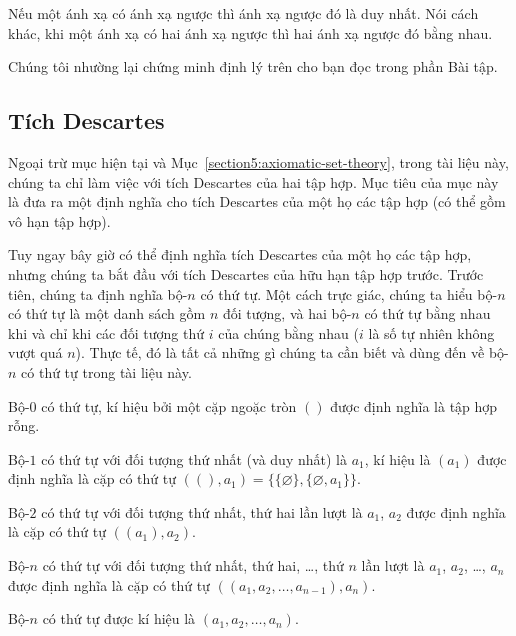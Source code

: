 \begin{theorem}
    Nếu một ánh xạ có ánh xạ ngược thì ánh xạ ngược đó là duy nhất. Nói cách khác, khi một ánh xạ có hai ánh xạ ngược thì hai ánh xạ ngược đó bằng nhau.
\end{theorem}

Chúng tôi nhường lại chứng minh định lý trên cho bạn đọc trong phần Bài tập.

\subsection{Tích Descartes}

Ngoại trừ mục hiện tại và Mục~\ref{section5:axiomatic-set-theory}, trong tài liệu này, chúng ta chỉ làm việc với tích Descartes của hai tập hợp. Mục tiêu của mục này là đưa ra một định nghĩa cho tích Descartes của một họ các tập hợp (có thể gồm vô hạn tập hợp).

Tuy ngay bây giờ có thể định nghĩa tích Descartes của một họ các tập hợp, nhưng chúng ta bắt đầu với tích Descartes của hữu hạn tập hợp trước. Trước tiên, chúng ta định nghĩa bộ-$n$ có thứ tự. Một cách trực giác, chúng ta hiểu bộ-$n$ có thứ tự là một danh sách gồm $n$ đối tượng, và hai bộ-$n$ có thứ tự bằng nhau khi và chỉ khi các đối tượng thứ $i$ của chúng bằng nhau ($i$ là số tự nhiên không vượt quá $n$). Thực tế, đó là tất cả những gì chúng ta cần biết và dùng đến về bộ-$n$ có thứ tự trong tài liệu này.

\begin{definition}[Bộ-$n$ có thứ tự]
    Bộ-$0$ có thứ tự, kí hiệu bởi một cặp ngoặc tròn $()$ được định nghĩa là tập hợp rỗng.

    Bộ-$1$ có thứ tự với đối tượng thứ nhất (và duy nhất) là $a_{1}$, kí hiệu là $(a_{1})$ được định nghĩa là cặp có thứ tự $((), a_{1}) = \{ \{ \varnothing \}, \{ \varnothing, a_{1} \} \}$.

    Bộ-$2$ có thứ tự với đối tượng thứ nhất, thứ hai lần lượt là $a_{1}$, $a_{2}$ được định nghĩa là cặp có thứ tự $((a_{1}), a_{2})$.

    Bộ-$n$ có thứ tự với đối tượng thứ nhất, thứ hai, \ldots, thứ $n$ lần lượt là $a_{1}$, $a_{2}$, \ldots, $a_{n}$ được định nghĩa là cặp có thứ tự $((a_{1}, a_{2}, \ldots, a_{n-1}), a_{n})$.

    Bộ-$n$ có thứ tự được kí hiệu là $(a_{1}, a_{2}, \ldots, a_{n})$.
\end{definition}

